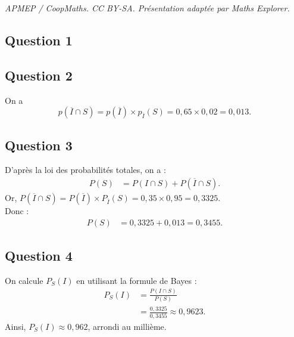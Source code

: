 \documentclass[10pt]{article}
\begin{document}
\noindent\textit{APMEP / CoopMaths. CC BY-SA. Présentation adaptée par Maths Explorer.}\par\medskip
\subsection*{Question 1}
\begin{center}
\end{center}
\subsection*{Question 2}
On a 
\[
p\left(\overline{I} \cap S\right) = p\left(\overline{I}\right) \times p_{\overline{I}}(S) = 0{,}65 \times 0{,}02 = 0{,}013.
\]
\subsection*{Question 3}

D'après la loi des probabilités totales, on a :
\begin{align*}
	P(S) &= P(I \cap S) + P(\overline{I} \cap S).
\end{align*}
Or, $P(\overline{I} \cap S) = P(\overline{I}) \times P_{\overline{I}}(S) = 0,35 \times 0,95 = 0,3325$.\\
Donc :
\begin{align*}
	P(S) &= 0,3325 + 0,013 = 0,3455.
\end{align*}

\subsection*{Question 4}

On calcule $P_S(I)$ en utilisant la formule de Bayes :
\begin{align*}
	P_S(I) &= \frac{P(I \cap S)}{P(S)} \\
	&= \frac{0,3325}{0,3455} \approx 0,9623.
\end{align*}
Ainsi, $P_S(I) \approx 0,962$, arrondi au millième.
\end{document}
